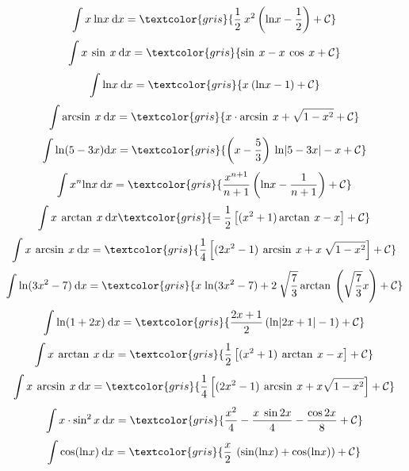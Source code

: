 {\begin{fleqn}
	\begin{equation}
		\int x\: \mathrm{ln} x \: \mathrm{d}x=\textcolor{gris}{\frac 1 2 \: x^2 \left( \mathrm{ln} x - \frac 1 2 \right) + \mathcal C}
	\end{equation}
	\begin{equation}
		\int x\: \sin\: x \: \mathrm{d}x=\textcolor{gris}{\sin\: x-x\: \cos \: x+\mathcal C}
	\end{equation}
	\begin{equation}
		\int \mathrm{ln} x \: \mathrm{d}x=\textcolor{gris}{x\: (\mathrm{ln} x - 1)+\mathcal C}
	\end{equation}
	\begin{equation}
		\int \arcsin\: x\: \mathrm{d}x=\textcolor{gris}{x\cdot \arcsin\: x+ \sqrt{1-x^2}+\mathcal C}
	\end{equation}
	\begin{equation}
		\int \mathrm{ln}(5-3x)\mathrm{d}x=\textcolor{gris}{\left(x-\frac 5 3 \right)\:\mathrm{ln}|5-3x| - x +\mathcal C}
	\end{equation}
	\begin{equation}
		\int x^n \mathrm{ln} x \: \mathrm{d}x=\textcolor{gris}{\frac{x^{n+1}}{n+1}\left( \mathrm{ln} x - \frac {1}{n+1} \right) +\mathcal C}
	\end{equation}
	\begin{equation}
		\int x \: \arctan\: x \: \mathrm{d}x\textcolor{gris}{=\frac 1 2 \left[ (x^2+1)\arctan \: x-x \right] + \mathcal C}
	\end{equation}
	\begin{equation}
		\int x\: \arcsin\: x \: \mathrm{d}x=\textcolor{gris}{\frac 1 4 \left[ (2x^2-1)\: \arcsin\: x+ x \: \sqrt{1-x^2} \right] + \mathcal C}
	\end{equation}
	\begin{equation}
		\int \mathrm{ln}(3x^2-7)\: \mathrm{d}x= \textcolor{gris}{x\;\mathrm{ln}(3x^2-7)+ 2\: \sqrt{\frac 7 3} \arctan\: \left( \sqrt{\frac 7 3 } x \right)+\mathcal C}
	\end{equation}
	\begin{equation}
		\int \mathrm{ln}(1+2x)\: \mathrm{d}x =\textcolor{gris}{\dfrac {2x+1}{2}\left( \mathrm{ln}|2x+1|-1 \right)+\mathcal C}
	\end{equation}
	\begin{equation}
		\int x\: \arctan \: x \: \mathrm{d}x=\textcolor{gris}{\frac 1 2 \left[ (x^2+1)\:\arctan\: x-x\right]+\mathcal C}
	\end{equation}
	\begin{equation}
		\int x \: \arcsin\: x\: \mathrm{d}x=\textcolor{gris}{\frac 1 4 \left[ (2x^2-1)\:\arcsin\: x+x\sqrt{1-x^2} \right] + \mathcal C}
	\end{equation}
	\begin{equation}
		\int x\cdot \sin^2 x\:\mathrm{d}x=\textcolor{gris}{\frac{x^2}{4}-\dfrac {x\; \sin 2x}{4}- \dfrac {\cos 2x}{8}+\mathcal C}
	\end{equation}
	\begin{equation}
		\int \cos(\mathrm{ln} x)\: \mathrm{d}x=\textcolor{gris}{\frac x 2 \: \left( \sin (\mathrm{ln} x)+\cos (\mathrm{ln} x) \right)+\mathcal C}
	\end{equation}
		

\end{fleqn}}
